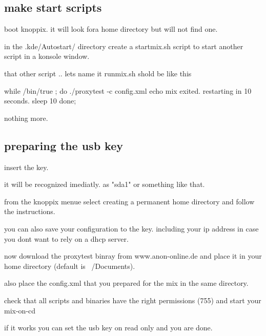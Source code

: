 \documentclass{article}
\begin{document}



\subsection{make start scripts}

boot knoppix. it will look fora home directory but will not find one.

in the .kde/Autostart/ directory create a startmix.sh script to start another
script in a konsole window.


that other script .. lets name it runmix.sh shold be like this

while /bin/true ; do
  ./proxytest -c config.xml
  echo mix exited. restarting in 10 seconds.
  sleep 10
done;

nothing more.

\subsection{preparing the usb key}

insert the key.

it will be recognized imediatly. as "sda1" or something like that.

from the knoppix menue select creating a permanent home directory and follow
the instructions.

you can also save your configuration to the key. including your ip address
in case you dont want to rely on a dhcp server.

now download the proxytest binray from www.anon-online.de and place it in
your home directory (default is ~/Documents).

also place the config.xml that you prepared for the mix in the same
directory.

check that all scripts and binaries have the right permissions (755) and
start your mix-on-cd

if it works you can set the usb key on read only and you are done.
\end{document}
